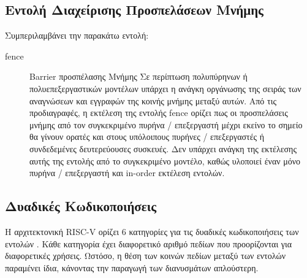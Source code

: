 \documentclass[11pt]{extarticle}
\begin{document}
    \subsection{Εντολή Διαχείρισης Προσπελάσεων Μνήμης}
    Συμπεριλαμβάνει την παρακάτω εντολή:
    \begin{description} 
        \item [fence] Barrier προσπέλασης Μνήμης \newline
        Σε περίπτωση πολυπύρηνων ή πολυεπεξεργαστικών μοντέλων υπάρχει η ανάγκη οργάνωσης της σειράς των αναγνώσεων και εγγραφών της κοινής μνήμης μεταξύ αυτών.
        Από τις προδιαγραφές, η εκτέλεση της εντολής fence ορίζει πως οι προσπελάσεις μνήμης από τον συγκεκριμένο πυρήνα / επεξεργαστή μέχρι εκείνο το σημείο θα γίνουν ορατές και στους υπόλοιπους πυρήνες / επεξεργαστές ή συνδεδεμένες δευτερεύουσες συσκευές.
        Δεν υπάρχει ανάγκη της εκτέλεσης αυτής της εντολής από το συγκεκριμένο μοντέλο, καθώς υλοποιεί έναν μόνο πυρήνα / επεξεργαστή και in-order εκτέλεση εντολών.
    \end{description}

\newpage    
\subsection{Δυαδικές Κωδικοποιήσεις}
Η αρχιτεκτονική RISC-V ορίζει 6 κατηγορίες για τις δυαδικές κωδικοποιήσεις των εντολών \cite{spec}.
Κάθε κατηγορία έχει διαφορετικό αριθμό πεδίων που προορίζονται για διαφορετικές χρήσεις.
Ωστόσο, η θέση των κοινών πεδίων μεταξύ των εντολών παραμένει ίδια, κάνοντας την παραγωγή των διανυσμάτων απλούστερη.
\end{document}
